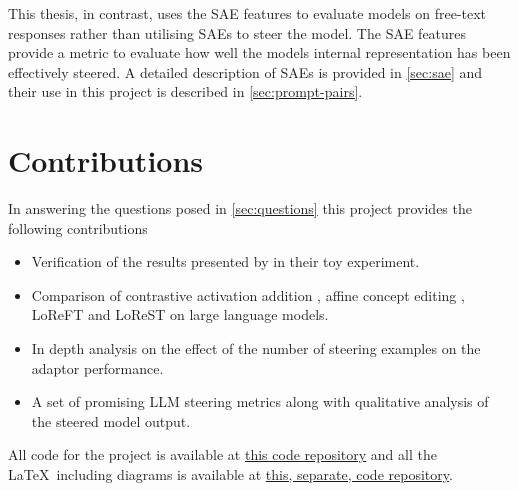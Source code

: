 This thesis, in contrast, uses the SAE features to evaluate models on free-text responses rather than utilising SAEs to steer the model.
The SAE features provide a metric to evaluate how well the models internal representation has been effectively steered.
A detailed description of SAEs is provided in \cref{sec:sae} and their use in this project is described in \cref{sec:prompt-pairs}.

\section{Contributions}
\label{sec:contributions}

In answering the questions posed in \cref{sec:questions} this project provides the following contributions
\begin{itemize}[nolistsep]
    \item Verification of the results presented by \citet{steering-clear} in their toy experiment.
    \item Comparison of contrastive activation addition \citep[CAA]{caa}, affine concept editing \citep[ACE]{ace}, LoReFT and LoReST on large language models.
    \item In depth analysis on the effect of the number of steering examples on the adaptor performance.
    \item A set of promising LLM steering metrics along with qualitative analysis of the steered model output.
\end{itemize}

All code for the project is available at \href{https://github.com/skyepurchase/msc_thesis}{this code repository} and all the \LaTeX~including diagrams is available at \href{https://github.com/skyepurchase/msc_report}{this, separate, code repository}.
